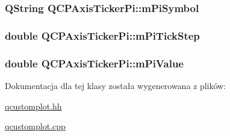 \subsubsection[{\texorpdfstring{m\+Pi\+Symbol}{mPiSymbol}}]{\setlength{\rightskip}{0pt plus 5cm}Q\+String Q\+C\+P\+Axis\+Ticker\+Pi\+::m\+Pi\+Symbol\hspace{0.3cm}{\ttfamily [protected]}}\hypertarget{class_q_c_p_axis_ticker_pi_a0962084571116e4d98e4dccc2e68f5ea}{}\label{class_q_c_p_axis_ticker_pi_a0962084571116e4d98e4dccc2e68f5ea}
\subsubsection[{\texorpdfstring{m\+Pi\+Tick\+Step}{mPiTickStep}}]{\setlength{\rightskip}{0pt plus 5cm}double Q\+C\+P\+Axis\+Ticker\+Pi\+::m\+Pi\+Tick\+Step\hspace{0.3cm}{\ttfamily [protected]}}\hypertarget{class_q_c_p_axis_ticker_pi_a943706b7796d778c62915498864bbeb8}{}\label{class_q_c_p_axis_ticker_pi_a943706b7796d778c62915498864bbeb8}
\subsubsection[{\texorpdfstring{m\+Pi\+Value}{mPiValue}}]{\setlength{\rightskip}{0pt plus 5cm}double Q\+C\+P\+Axis\+Ticker\+Pi\+::m\+Pi\+Value\hspace{0.3cm}{\ttfamily [protected]}}\hypertarget{class_q_c_p_axis_ticker_pi_ab3e899a3d23ada89eb48b465204b09ea}{}\label{class_q_c_p_axis_ticker_pi_ab3e899a3d23ada89eb48b465204b09ea}


Dokumentacja dla tej klasy została wygenerowana z plików\+:\begin{DoxyCompactItemize}
\item 
\hyperlink{qcustomplot_8hh}{qcustomplot.\+hh}\item 
\hyperlink{qcustomplot_8cpp}{qcustomplot.\+cpp}\end{DoxyCompactItemize}
